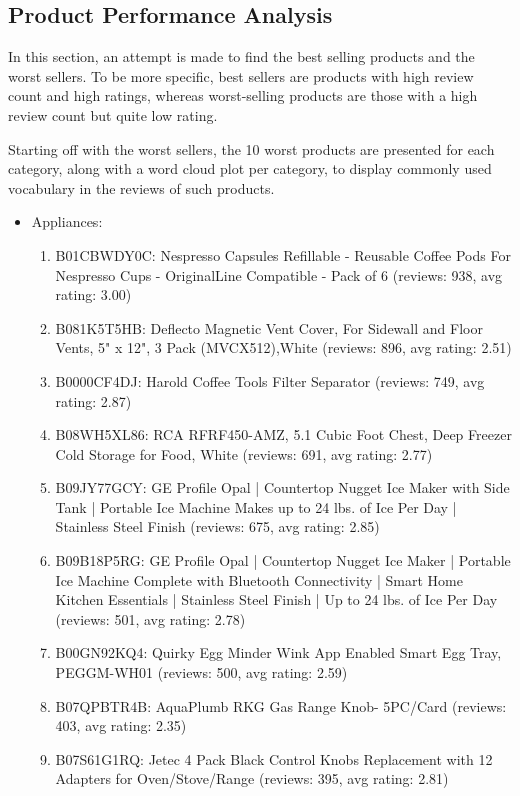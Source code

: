 \documentclass[a4paper, 12pt]{article}
\begin{document}
\subsection{Product Performance Analysis}
In this section, an attempt is made to find the best selling products and the worst sellers. To be more specific, best sellers are products with high review count and high ratings, whereas worst-selling products are those with a high review count but quite low rating.

Starting off with the worst sellers, the 10 worst products are presented for each category, along with a word cloud plot per category, to display commonly used vocabulary in the reviews of such products.
\begin{itemize}
    \item Appliances:
        \begin{enumerate}
            \item B01CBWDY0C: Nespresso Capsules Refillable - Reusable Coffee Pods For Nespresso Cups - OriginalLine Compatible - Pack of 6 (reviews: 938, avg rating: 3.00)
            \item B081K5T5HB: Deflecto Magnetic Vent Cover, For Sidewall and Floor Vents, 5" x 12", 3 Pack (MVCX512),White (reviews: 896, avg rating: 2.51)
            \item B0000CF4DJ: Harold Coffee Tools Filter Separator (reviews: 749, avg rating: 2.87)
            \item B08WH5XL86: RCA RFRF450-AMZ, 5.1 Cubic Foot Chest, Deep Freezer Cold Storage for Food, White (reviews: 691, avg rating: 2.77)
            \item B09JY77GCY: GE Profile Opal | Countertop Nugget Ice Maker with Side Tank | Portable Ice Machine Makes up to 24 lbs. of Ice Per Day | Stainless Steel Finish (reviews: 675, avg rating: 2.85)
            \item B09B18P5RG: GE Profile Opal | Countertop Nugget Ice Maker | Portable Ice Machine Complete with Bluetooth Connectivity | Smart Home Kitchen Essentials | Stainless Steel Finish | Up to 24 lbs. of Ice Per Day (reviews: 501, avg rating: 2.78)
            \item B00GN92KQ4: Quirky Egg Minder Wink App Enabled Smart Egg Tray, PEGGM-WH01 (reviews: 500, avg rating: 2.59)
            \item B07QPBTR4B: AquaPlumb RKG Gas Range Knob- 5PC/Card (reviews: 403, avg rating: 2.35)
            \item B07S61G1RQ: Jetec 4 Pack Black Control Knobs Replacement with 12 Adapters for Oven/Stove/Range (reviews: 395, avg rating: 2.81)

\end{enumerate}
\end{itemize}
\end{document}
